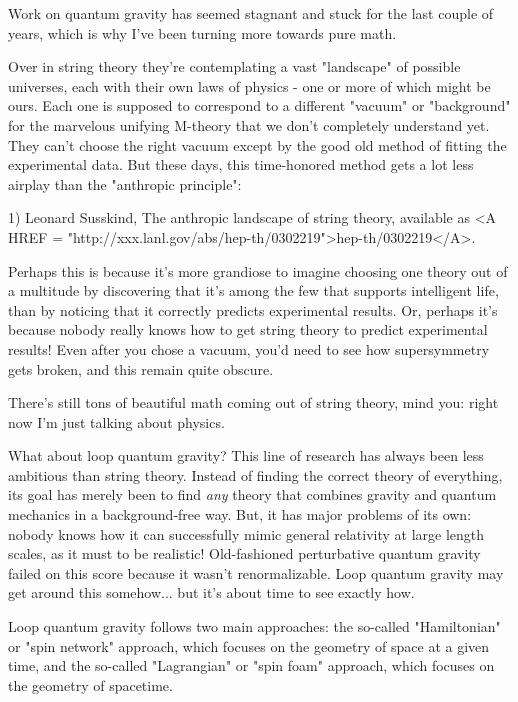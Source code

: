 


Work on quantum gravity has seemed stagnant and stuck for the 
last couple of years, which is why I've been turning more
towards pure math.  

Over in string theory they're contemplating a vast "landscape" of 
possible universes, each with their own laws of physics - one or
more of which might be ours.  Each one is supposed to correspond
to a different "vacuum" or "background" for the 
marvelous unifying
M-theory that we don't completely understand yet.  They can't 
choose the right vacuum except by the good old method of fitting 
the experimental data.  But these days, this time-honored method 
gets a lot less airplay than the "anthropic principle":

1) Leonard Susskind, The anthropic landscape of string theory,
available as <A HREF = "http://xxx.lanl.gov/abs/hep-th/0302219">hep-th/0302219</A>.

Perhaps this is because it's more grandiose to imagine choosing 
one theory out of a multitude by discovering that it's among the 
few that supports intelligent life, than by noticing that it 
correctly predicts experimental results.  Or, perhaps it's because
nobody really knows how to get string theory to predict experimental
results!  Even after you chose a vacuum, you'd need to see how
supersymmetry gets broken, and this remain quite obscure.

There's still tons of beautiful math coming out of string theory,
mind you: right now I'm just talking about physics.
 
What about loop quantum gravity?  This line of research has always 
been less ambitious than string theory.  Instead of finding the 
correct theory of everything, its goal has merely been to find 
\emph{any} theory that combines gravity and quantum mechanics in a 
background-free way.  But, it has major problems of its own:
nobody knows how it can successfully mimic general relativity
at large length scales, as it must to be realistic!  Old-fashioned
perturbative quantum gravity failed on this score because it 
wasn't renormalizable.  Loop quantum gravity may get around this
somehow... but it's about time to see exactly how.

Loop quantum gravity follows two main approaches: the so-called
"Hamiltonian" or "spin network" approach, which focuses on the 
geometry of space at a given time, and the so-called "Lagrangian" 
or "spin foam" approach, which focuses on the geometry of 
spacetime. 


